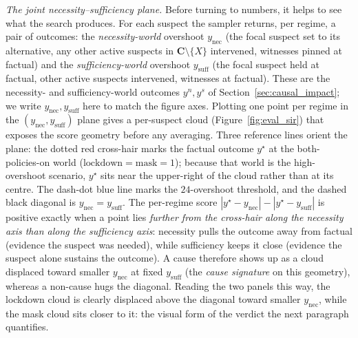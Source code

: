\medskip\noindent\textit{The joint necessity--sufficiency plane.}
Before turning to numbers, it helps to see what the search produces. For each
suspect the sampler returns, per regime, a pair of outcomes: the
\emph{necessity-world} overshoot $y_{\mathrm{nec}}$ (the focal suspect set to
its alternative, any other active suspects in $\mathbf{C}\setminus\{X\}$
intervened, witnesses pinned at factual) and the \emph{sufficiency-world}
overshoot $y_{\mathrm{suff}}$ (the focal suspect held at factual, other active
suspects intervened, witnesses at factual). These are the necessity- and
sufficiency-world outcomes $y^n, y^s$ of Section~\ref{sec:causal_impact}; we
write $y_{\mathrm{nec}}, y_{\mathrm{suff}}$ here to match the figure axes. Plotting one point per regime in the
$(y_{\mathrm{nec}}, y_{\mathrm{suff}})$ plane gives a per-suspect cloud
(Figure~\ref{fig:eval_sir}) that exposes the score geometry before any
averaging. Three reference lines orient the plane: the dotted red cross-hair
marks the factual outcome $y^\star$ at the both-policies-on world
($\mathrm{lockdown}=\mathrm{mask}=1$); because that world is the high-overshoot
scenario, $y^\star$ sits near the upper-right of the cloud rather than at its
centre. The dash-dot blue line marks the $24$-overshoot threshold, and the
dashed black diagonal is $y_{\mathrm{nec}}=y_{\mathrm{suff}}$. The per-regime
score $|y^\star-y_{\mathrm{nec}}| - |y^\star-y_{\mathrm{suff}}|$ is positive
exactly when a point lies \emph{further from the cross-hair along the necessity
axis than along the sufficiency axis}: necessity pulls the outcome away from
factual (evidence the suspect was needed), while sufficiency keeps it close
(evidence the suspect alone sustains the outcome). A cause therefore shows up as
a cloud displaced toward smaller $y_{\mathrm{nec}}$ at fixed $y_{\mathrm{suff}}$ (the \emph{cause signature} on this geometry), whereas a non-cause hugs the
diagonal. Reading the two panels this way, the lockdown cloud is clearly
displaced above the diagonal toward smaller $y_{\mathrm{nec}}$, while the mask
cloud sits closer to it: the visual form of the verdict the next paragraph
quantifies.


